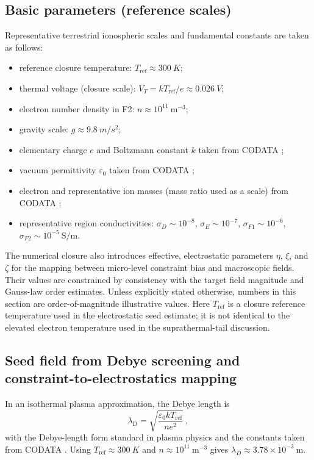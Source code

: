\documentclass[11pt,a4paper]{article}
\begin{document}
\subsection{Basic parameters (reference scales)}
Representative terrestrial ionospheric scales and fundamental constants are taken as follows:
\begin{itemize}
  \item reference closure temperature: $T_{\mathrm{ref}}\approx \SI{300}{K}$;
  \item thermal voltage (closure scale): $V_T = kT_{\mathrm{ref}}/e \approx \SI{0.026}{V}$;
  \item electron number density in F2: $n\approx 10^{11}~\mathrm{m^{-3}}$;
  \item gravity scale: $g\approx \SI{9.8}{m/s^2}$;
  \item elementary charge $e$ and Boltzmann constant $k$ taken from CODATA \cite{Tiesinga2021CODATA};
  \item vacuum permittivity $\varepsilon_0$ taken from CODATA \cite{Tiesinga2021CODATA};
  \item electron and representative ion masses (mass ratio used as a scale) from CODATA \cite{Tiesinga2021CODATA};
  \item representative region conductivities: $\sigma_D\sim 10^{-8}$, $\sigma_E\sim 10^{-7}$, $\sigma_{F1}\sim 10^{-6}$, $\sigma_{F2}\sim 10^{-5}~\mathrm{S/m}$.
\end{itemize}
The numerical closure also introduces effective, electrostatic parameters $\eta$, $\xi$, and $\zeta$ for the mapping between micro-level constraint bias and macroscopic fields. Their values are constrained by consistency with the target field magnitude and Gauss-law order estimates. Unless explicitly stated otherwise, numbers in this section are order-of-magnitude illustrative values. Here $T_{\mathrm{ref}}$ is a closure reference temperature used in the electrostatic seed estimate; it is not identical to the elevated electron temperature used in the suprathermal-tail discussion.

\subsection{Seed field from Debye screening and constraint-to-electrostatics mapping}
In an isothermal plasma approximation, the Debye length is
\begin{equation}
\lambda_{\mathrm{D}}=\sqrt{\frac{\varepsilon_0 kT_{\mathrm{ref}}}{n e^2}}\ ,
\end{equation}
with the Debye-length form standard in plasma physics \cite{ChenPlasmaPhysics1984} and the constants taken from CODATA \cite{Tiesinga2021CODATA}. Using $T_{\mathrm{ref}}\approx \SI{300}{K}$ and $n\approx 10^{11}~\mathrm{m^{-3}}$ gives $\lambda_D\approx 3.78\times 10^{-3}~\mathrm{m}$.
\end{document}
